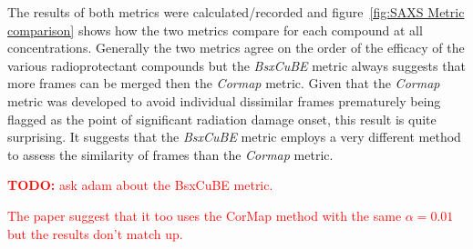The results of both metrics were calculated/recorded and figure~\ref{fig:SAXS Metric comparison} shows how the two metrics compare for each compound at all concentrations.
Generally the two metrics agree on the order of the efficacy of the various radioprotectant compounds but the \textit{BsxCuBE} metric always suggests that more frames can be merged then the \textit{Cormap} metric.
Given that the \textit{Cormap} metric was developed to avoid individual dissimilar frames prematurely being flagged as the point of significant radiation damage onset, this result is quite surprising.
It suggests that the \textit{BsxCuBE} metric employs a very different method to assess the similarity of frames than the \textit{Cormap} metric.
\textcolor{red}{
    \begin{myenumerate}
        \item \hypertarget{todo:Ask Adam about BsxCuBE}{\textbf{TODO:} ask adam about the BsxCuBE metric.}
        The paper suggest that it too uses the CorMap method with the same $\alpha = 0.01$ but the results don't match up.
    \end{myenumerate}
}
